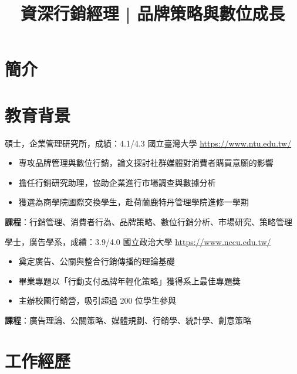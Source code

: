 \documentclass[a4paper, serif, 10pt]{moderncv}
\title{資深行銷經理 | 品牌策略與數位成長}
\begin{document}
\maketitle

\section{簡介}

\section{教育背景}

        {碩士，企業管理研究所，成績：4.1/4.3}
        {國立臺灣大學}
        {\url{https://www.ntu.edu.tw/}}
        {}
        {\begin{itemize}
\item 專攻品牌管理與數位行銷，論文探討社群媒體對消費者購買意願的影響
\item 擔任行銷研究助理，協助企業進行市場調查與數據分析
\item 獲選為商學院國際交換學生，赴荷蘭鹿特丹管理學院進修一學期
\end{itemize}
\textbf{課程}：行銷管理、消費者行為、品牌策略、數位行銷分析、市場研究、策略管理}

        {學士，廣告學系，成績：3.9/4.0}
        {國立政治大學}
        {\url{https://www.nccu.edu.tw/}}
        {}
        {\begin{itemize}
\item 奠定廣告、公關與整合行銷傳播的理論基礎
\item 畢業專題以「行動支付品牌年輕化策略」獲得系上最佳專題獎
\item 主辦校園行銷營，吸引超過 200 位學生參與
\end{itemize}
\textbf{課程}：廣告理論、公關策略、媒體規劃、行銷學、統計學、創意策略}
\section{工作經歷}
\end{document}
